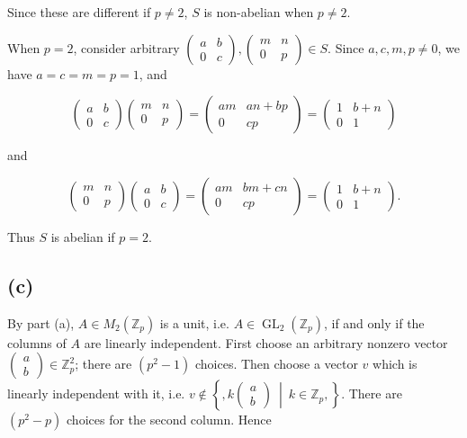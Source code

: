 Since these are different if \(p \neq 2\), \(S\) is non-abelian when \(p \neq 2\).

When \(p = 2\), consider arbitrary \(\begin{pmatrix}
a & b \\
0 & c
\end{pmatrix},\begin{pmatrix}
m & n \\
0 & p
\end{pmatrix} \in S\). Since \(a,c,m,p \neq 0\), we have \(a = c = m = p = 1\), and

\[\begin{pmatrix}
a & b \\
0 & c
\end{pmatrix}\begin{pmatrix}
m & n \\
0 & p
\end{pmatrix} = \begin{pmatrix}
{am} & {an + bp} \\
0 & {cp}
\end{pmatrix} = \begin{pmatrix}
1 & {b + n} \\
0 & 1
\end{pmatrix}\]

and

\[\begin{pmatrix}
m & n \\
0 & p
\end{pmatrix}\begin{pmatrix}
a & b \\
0 & c
\end{pmatrix} = \begin{pmatrix}
{am} & {bm + cn} \\
0 & {cp}
\end{pmatrix} = \begin{pmatrix}
1 & {b + n} \\
0 & 1
\end{pmatrix}.\]

Thus \(S\) is abelian if \(p = 2\).

\subsection{(c)}

By part (a), \(A \in M_{2}\left( \mathbb{Z}_{p} \right)\) is a unit, i.e. \(A \in \operatorname{GL}_{2}\left( \mathbb{Z}_{p} \right)\), if and only if the columns of \(A\) are linearly independent. First choose an arbitrary nonzero vector \(\begin{pmatrix}
a \\
b
\end{pmatrix} \in \mathbb{Z}_{p}^{2}\); there are \(\left( {p^{2} - 1} \right)\) choices. Then choose a vector \(v\) which is linearly independent with it, i.e. \(v \notin \left\{ ,k\begin{pmatrix}
a \\
b
\end{pmatrix}\  \middle| \ k \in \mathbb{Z}_{p}, \right\}\). There are \(\left( {p^{2} - p} \right)\) choices for the second column. Hence

